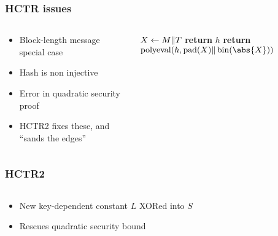 \documentclass[aspectratio=169]{beamer}
\newenvironment*{figslide}{
    \begin{columns}
        \begin{column}{.4\textwidth}

}{
\end{column}
\begin{column}{.6\textwidth}
    \begin{figure}
        
    \end{figure}
\end{column}
\end{columns}
}
\begin{document}
\begin{frame}

\frametitle{HCTR issues}
\begin{columns}
    \begin{column}{.4\textwidth}
        \begin{itemize}
            \item Block-length message special case
            \item Hash is non injective
            \item Error in quadratic security proof
            \item HCTR2 fixes these, and ``sands the edges''
        \end{itemize}
    \end{column}
    \begin{column}{.6\textwidth}
        \begin{algorithmic}
            \State \(X \gets M \Vert T\)
                \State \textbf{return} \(h\)
            \Else
                \State \textbf{return} \(\operatorname{polyeval}(h, \pad(X)\Concat\fromint(\abs{X}))\)
            \EndIf
            \EndProcedure
        \end{algorithmic}
\end{column}
\end{columns}

\end{frame}

\togglefalse{oldhctr}

\begin{frame}

\frametitle{HCTR2}
\begin{figslide}
    \begin{itemize}
        \item New key-dependent constant \(L\) XORed into \(S\)
        \item Rescues quadratic security bound
    \end{itemize}
\end{figslide}

\end{frame}
\end{document}
